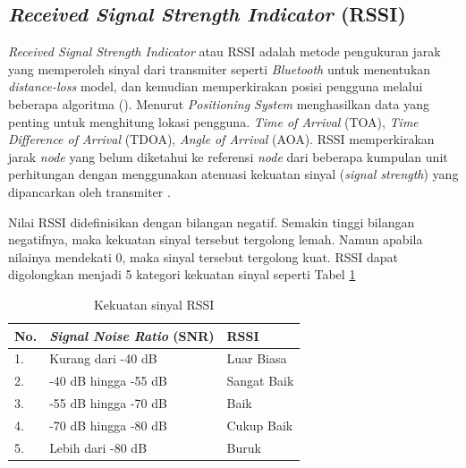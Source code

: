 \subsection{\textit{Received Signal Strength Indicator} (RSSI)}
\textit{Received Signal Strength Indicator} atau RSSI adalah metode pengukuran jarak yang memperoleh sinyal dari transmiter seperti \textit{Bluetooth} untuk menentukan \textit{distance-loss} model, dan kemudian memperkirakan posisi pengguna melalui beberapa algoritma (\citep{li2018indoor}). Menurut \citep{puspitasari2020} \textit{Positioning System} menghasilkan data yang penting untuk menghitung lokasi pengguna. \textit{Time of Arrival} (TOA), \textit{Time Difference of Arrival} (TDOA), \textit{Angle of Arrival} (AOA). RSSI memperkirakan jarak \textit{node} yang belum diketahui ke referensi \textit{node} dari beberapa kumpulan unit perhitungan dengan menggunakan atenuasi kekuatan sinyal (\textit{signal strength}) yang dipancarkan oleh transmiter \citep{puspitasari2020}.

\par Nilai RSSI didefinisikan dengan bilangan negatif. Semakin tinggi bilangan negatifnya, maka kekuatan sinyal tersebut tergolong lemah. Namun apabila nilainya mendekati 0, maka sinyal tersebut tergolong kuat. RSSI dapat digolongkan menjadi 5 kategori kekuatan sinyal seperti Tabel \ref{tab:sinyal_rssi}

\begin{table}[H]
\caption{Kekuatan sinyal RSSI \citep{sideeq2016smart}}
\label{tab:sinyal_rssi}
\centering
\begin{tabular}{|l|l|l|}
\hline
{\color[HTML]{000000} \textbf{No.}} & \textit{\textbf{Signal Noise Ratio }}(SNR) & \textbf{RSSI} \\ \hline
1. & Kurang dari -40 dB   & Luar Biasa  \\ \hline
2. & -40 dB hingga -55 dB & Sangat Baik \\ \hline
3. & -55 dB hingga -70 dB & Baik        \\ \hline
4. & -70 dB hingga -80 dB & Cukup Baik  \\ \hline
5. & Lebih dari -80 dB    & Buruk       \\ \hline
\end{tabular}
\end{table}


